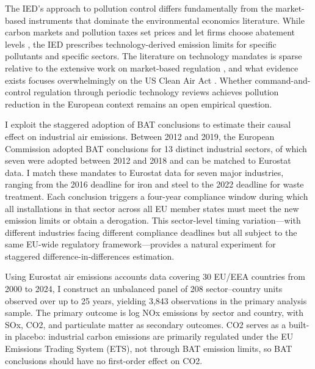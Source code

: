 \documentclass[12pt]{article}
\begin{document}
The IED's approach to pollution control differs fundamentally from the market-based instruments that dominate the environmental economics literature. While carbon markets and pollution taxes set prices and let firms choose abatement levels \citep{hepburn2006, ellerman2007}, the IED prescribes technology-derived emission limits for specific pollutants and specific sectors. The literature on technology mandates is sparse relative to the extensive work on market-based regulation \citep{jaffe1995, dechezlepretre2022}, and what evidence exists focuses overwhelmingly on the US Clean Air Act \citep{greenstone2004, walker2013, keiser2019, colmer2024, shapiro2024}. Whether command-and-control regulation through periodic technology reviews achieves pollution reduction in the European context remains an open empirical question.

I exploit the staggered adoption of BAT conclusions to estimate their causal effect on industrial air emissions. Between 2012 and 2019, the European Commission adopted BAT conclusions for 13 distinct industrial sectors, of which seven were adopted between 2012 and 2018 and can be matched to Eurostat data. I match these mandates to Eurostat data for seven major industries, ranging from the 2016 deadline for iron and steel to the 2022 deadline for waste treatment. Each conclusion triggers a four-year compliance window during which all installations in that sector across all EU member states must meet the new emission limits or obtain a derogation. This sector-level timing variation---with different industries facing different compliance deadlines but all subject to the same EU-wide regulatory framework---provides a natural experiment for staggered difference-in-differences estimation.

Using Eurostat air emissions accounts data covering 30 EU/EEA countries from 2000 to 2024, I construct an unbalanced panel of 208 sector--country units observed over up to 25 years, yielding 3,843 observations in the primary analysis sample. The primary outcome is log NOx emissions by sector and country, with SOx, CO2, and particulate matter as secondary outcomes. CO2 serves as a built-in placebo: industrial carbon emissions are primarily regulated under the EU Emissions Trading System (ETS), not through BAT emission limits, so BAT conclusions should have no first-order effect on CO2.
\end{document}
